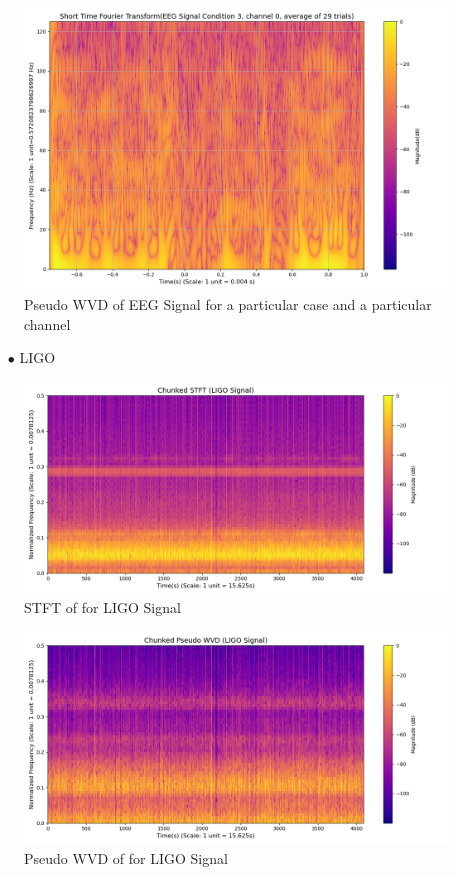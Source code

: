 \documentclass[12pt,a4paper,onecolumn]{exam}
\begin{document}
\begin{solution}
        \begin{figure}[H]
        \centering
        \includegraphics[scale = 0.35]{eegsignal_pwvd.png}
        \caption{Pseudo WVD of EEG Signal for a particular case and a particular channel}
        \label{fig:30}
        \end{figure}    

  \begin{itemize}
    \item[$\bullet$] LIGO
  \end{itemize}
        \begin{figure}[H]
        \centering
        \includegraphics[scale = 0.45]{ligosignal_stft.png}
        \caption{STFT of for LIGO Signal}
        \label{fig:31}
        \end{figure}

        \begin{figure}[H]
        \centering
        \includegraphics[scale = 0.45]{ligosignal_pwvd.png}
        \caption{Pseudo WVD of for LIGO Signal}
        \label{fig:32}
        \end{figure}   


\end{solution}
\end{document}
